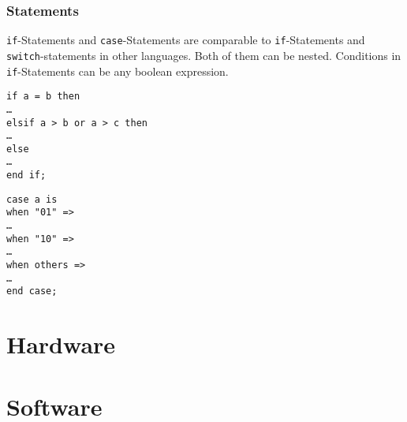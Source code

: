\documentclass{report}
\begin{document}
\subsection{Statements}
\texttt{if}-Statements and \texttt{case}-Statements are comparable to \texttt{if}-Statements and \texttt{switch}-statements in other languages. Both of them can be nested. Conditions in \texttt{if}-Statements can be any boolean expression.
\begin{multicols}{2}
\begin{verbatim}
if a = b then
…
elsif a > b or a > c then
…
else
…
end if;    
\end{verbatim}
\begin{verbatim}
case a is
when "01" =>
…
when "10" =>
…
when others =>
…
end case;    
\end{verbatim}    
\end{multicols}

\chapter{Hardware}
\thispagestyle{fancy}
\chapter{Software}
\thispagestyle{fancy}
\end{document}
